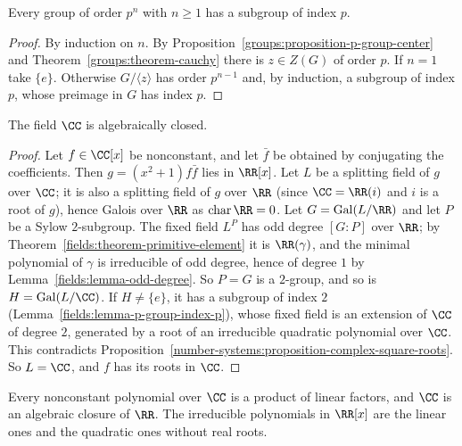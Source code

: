 \begin{lemma}\label{fields:lemma-p-group-index-p}
Every group of order $p^n$ with $n \geq 1$ has a subgroup of index $p$.
\end{lemma}

\begin{proof}
By induction on $n$. By Proposition~\ref{groups:proposition-p-group-center} and
Theorem~\ref{groups:theorem-cauchy} there is $z \in Z(G)$ of order $p$. If $n = 1$ take $\{e\}$.
Otherwise $G/\langle z \rangle$ has order $p^{n-1}$ and, by induction, a subgroup of index $p$,
whose preimage in $G$ has index $p$.
\end{proof}

\begin{theorem}\label{fields:theorem-fta}
The field $\CC$ is algebraically closed.
\end{theorem}

\begin{proof}
Let $f \in \CC[x]$ be nonconstant, and let $\bar f$ be obtained by conjugating the coefficients.
Then $g = (x^2 + 1) f \bar f$ lies in $\RR[x]$. Let $L$ be a splitting field of $g$ over $\CC$; it is also
a splitting field of $g$ over $\RR$ (since $\CC = \RR(i)$ and $i$ is a root of $g$), hence Galois over
$\RR$ as $\operatorname{char} \RR = 0$. Let $G = \mathrm{Gal}(L/\RR)$ and let $P$ be a Sylow $2$-subgroup.
The fixed field $L^P$ has odd degree $[G : P]$ over $\RR$; by
Theorem~\ref{fields:theorem-primitive-element} it is $\RR(\gamma)$, and the minimal polynomial of
$\gamma$ is irreducible of odd degree, hence of degree $1$ by Lemma~\ref{fields:lemma-odd-degree}.
So $P = G$ is a $2$-group, and so is $H = \mathrm{Gal}(L/\CC)$. If $H \neq \{e\}$, it has a subgroup of
index $2$ (Lemma~\ref{fields:lemma-p-group-index-p}), whose fixed field is an extension of
$\CC$ of degree $2$, generated by a root of an irreducible quadratic polynomial over $\CC$. This
contradicts Proposition~\ref{number-systems:proposition-complex-square-roots}. So
$L = \CC$, and $f$ has its roots in $\CC$.
\end{proof}

\begin{corollary}\label{fields:corollary-real-irreducibles}
Every nonconstant polynomial over $\CC$ is a product of linear factors, and $\CC$ is an
algebraic closure of $\RR$. The irreducible polynomials in $\RR[x]$ are the linear ones and the
quadratic ones without real roots.
\end{corollary}

